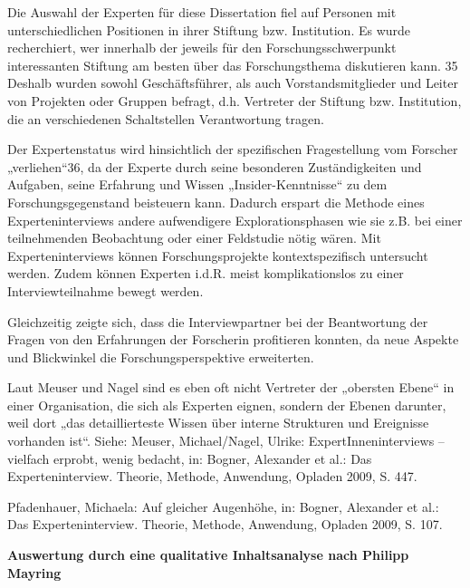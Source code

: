 Die Auswahl der Experten für diese Dissertation fiel auf Personen mit unterschiedlichen Positionen in ihrer Stiftung bzw. Institution. Es wurde recherchiert, wer innerhalb der jeweils für den Forschungsschwerpunkt interessanten Stiftung am besten über das Forschungsthema diskutieren kann. 35 Deshalb wurden sowohl Geschäftsführer, als auch Vorstandsmitglieder und Leiter von Projekten oder Gruppen befragt, d.h. Vertreter der Stiftung bzw. Institution, die an verschiedenen Schaltstellen Verantwortung tragen.

Der Expertenstatus wird hinsichtlich der spezifischen Fragestellung vom Forscher „verliehen“36, da der Experte durch seine besonderen Zuständigkeiten und Aufgaben, seine Erfahrung und Wissen „Insider-Kenntnisse“ zu dem Forschungsgegenstand beisteuern kann. Dadurch erspart die Methode eines Experteninterviews andere aufwendigere Explorationsphasen wie sie z.B. bei einer teilnehmenden Beobachtung oder einer Feldstudie nötig wären. Mit Experteninterviews können Forschungsprojekte kontextspezifisch untersucht werden. Zudem können Experten i.d.R. meist komplikationslos zu einer Interviewteilnahme bewegt werden.

Gleichzeitig zeigte sich, dass die Interviewpartner bei der Beantwortung der Fragen von den Erfahrungen der Forscherin profitieren konnten, da neue Aspekte und Blickwinkel die Forschungsperspektive erweiterten.

\begin{attentionForm}
Laut Meuser und Nagel sind es eben oft nicht Vertreter der „obersten Ebene“ in einer Organisation, die sich als Experten eignen, sondern der Ebenen darunter, weil dort „das detaillierteste Wissen über interne Strukturen und Ereignisse vorhanden ist“. 
Siehe: Meuser, Michael/Nagel, Ulrike: ExpertInneninterviews – vielfach erprobt, wenig bedacht, in: Bogner, Alexander et al.: Das Experteninterview. Theorie, Methode, Anwendung, Opladen 2009, S. 447. 

Pfadenhauer, Michaela: Auf gleicher Augenhöhe, in: Bogner, Alexander et al.: Das Experteninterview. Theorie, Methode, Anwendung, Opladen 2009, S. 107.
\end{attentionForm}

\textbf{Auswertung durch eine qualitative Inhaltsanalyse nach Philipp Mayring}
